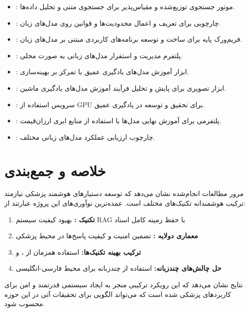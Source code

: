 \documentclass[11pt, a4paper, oneside]{book}
\begin{document}
	\begin{itemize}
		\item \textbf{}: موتور جستجوی توزیع‌شده و مقیاس‌پذیر برای جستجوی متنی و تحلیل داده‌ها.
		\item \textbf{}: چارچوبی برای تعریف و اعمال محدودیت‌ها و قوانین روی مدل‌های زبان.
		\item \textbf{}: فریم‌ورک پایه برای ساخت و توسعه برنامه‌های کاربردی مبتنی بر مدل‌های زبان.
		\item \textbf{}: پلتفرم مدیریت و استقرار مدل‌های زبانی به صورت محلی.
		\item \textbf{}: ابزار آموزش مدل‌های یادگیری عمیق با تمرکز بر بهینه‌سازی.
		\item \textbf{}: ابزار تصویری برای پایش و تحلیل فرآیند آموزش مدل‌های یادگیری ماشین.
		\item \textbf{}: سرویس استفاده از GPU برای تحقیق و توسعه در یادگیری عمیق.
		\item \textbf{}: پلتفرمی برای آموزش نهایی مدل‌ها با استفاده از منابع ابری ارزان‌قیمت.
		\item \textbf{}: چارچوب ارزیابی عملکرد مدل‌های زبانی مختلف.
	\end{itemize}
	

	\section{خلاصه و جمع‌بندی}
	
	مرور مطالعات انجام‌شده نشان می‌دهد که توسعه دستیارهای هوشمند پزشکی نیازمند ترکیب هوشمندانه تکنیک‌های مختلف است. عمده‌ترین نوآوری‌های این پروژه عبارتند از:
	
	\begin{enumerate}
		\item \textbf{تکنیک :} بهبود کیفیت سیستم RAG با حفظ زمینه کامل اسناد
		\item \textbf{معماری دولایه :} تضمین امنیت و کیفیت پاسخ‌ها در محیط پزشکی
		\item \textbf{ترکیب بهینه تکنیک‌ها:} استفاده همزمان از ،  و 
		\item \textbf{حل چالش‌های چندزبانه:} استفاده از  چندزبانه برای محیط فارسی-انگلیسی
	\end{enumerate}
	
	نتایج نشان می‌دهد که این رویکرد ترکیبی منجر به ایجاد سیستمی قدرتمند و امن برای کاربردهای پزشکی شده است که می‌تواند الگویی برای تحقیقات آتی در این حوزه محسوب شود.
	
\end{document}
